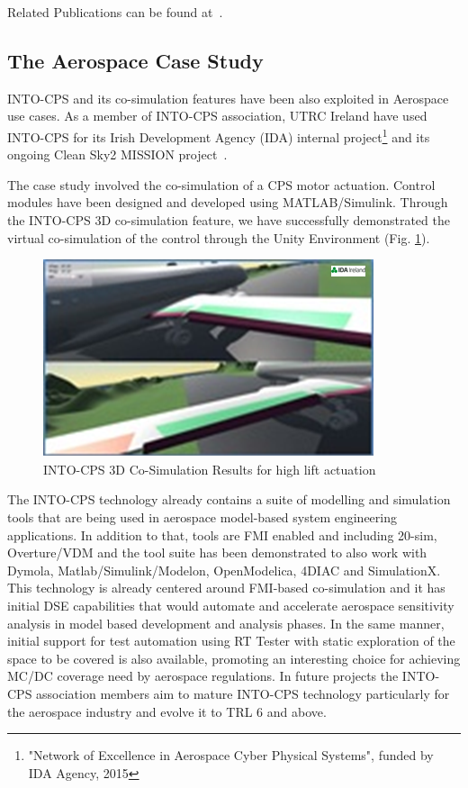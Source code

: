 Related Publications can be found at~\cite{Larsen&16d,Fitzgerald&18,Hasanagic&18b}.

\subsection{The Aerospace Case Study}
INTO-CPS and its co-simulation features have been also exploited in Aerospace use cases. As a member of INTO-CPS association, UTRC Ireland have used INTO-CPS for its Irish Development Agency (IDA) internal project\footnote{"Network of Excellence in Aerospace Cyber Physical Systems", funded by IDA Agency, 2015} and its ongoing Clean Sky2 MISSION project~\cite{Burgio&17}.

The case study involved the co-simulation of a CPS motor actuation. Control modules have been designed and developed using MATLAB/Simulink. Through the INTO-CPS 3D co-simulation feature, we have successfully demonstrated the virtual co-simulation of the control through the Unity Environment (Fig. \ref{fig:aero}).

\begin{figure}[!ht]
	\centering
		\includegraphics[width=0.9 \textwidth]{./figures/aero}
	\caption{INTO-CPS 3D Co-Simulation Results for high lift actuation}
	\label{fig:aero}
\end{figure}

The INTO-CPS technology already contains a suite of modelling and simulation tools that are being used in aerospace model-based system engineering applications. In addition to that, tools are FMI enabled and including 20-sim, Overture/VDM and the tool suite has been demonstrated to also work with Dymola, Matlab/Simulink/Modelon, OpenModelica, 4DIAC and SimulationX. This technology is already centered around FMI-based co-simulation and it has initial DSE capabilities that would automate and accelerate aerospace sensitivity analysis in model based development and analysis phases. In the same manner, initial support for test automation using RT Tester with static exploration of the space to be covered is also available, promoting an interesting choice for achieving MC/DC coverage need by aerospace regulations. In future projects the INTO-CPS association members aim to mature INTO-CPS  technology particularly for the aerospace industry and evolve it to TRL 6 and above.

